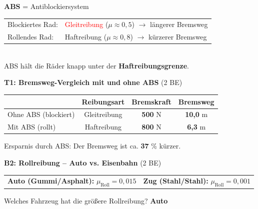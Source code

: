 \documentclass[a4paper,11pt]{article}
\newcommand{\lsg}[1]{\textcolor{loesung}{\textbf{#1}}}
\begin{document}
\begin{tcolorbox}[colback=white, colframe=physik, boxrule=1pt, arc=0pt,
    title={\textbf{K2: So funktioniert ABS}}, fonttitle=\normalsize, coltitle=black, colbacktitle=white]
\textbf{ABS} = Antiblockiersystem\\[1mm]
\begin{tabular}{@{}ll@{}}
Blockiertes Rad: & \textcolor{red}{Gleitreibung} ($\mu \approx 0{,}5$) $\rightarrow$ längerer Bremsweg \\
Rollendes Rad: & \textcolor{success}{Haftreibung} ($\mu \approx 0{,}8$) $\rightarrow$ kürzerer Bremsweg \\
\end{tabular}\\[1mm]
ABS hält die Räder knapp unter der \lsg{Haftreibungsgrenze}.
\end{tcolorbox}

\vspace{2mm}


\textbf{T1: Bremsweg-Vergleich mit und ohne ABS} \hfill (2 BE)

\begin{center}
\begin{tabular}{|l|c|c|c|}
\hline
\rowcolor{white}
 & \textbf{Reibungsart} & \textbf{Bremskraft} & \textbf{Bremsweg} \\
\hline
Ohne ABS (blockiert) & Gleitreibung & \lsg{500} N & \lsg{10,0} m \\
\hline
Mit ABS (rollt) & Haftreibung & \lsg{800} N & \lsg{6,3} m \\
\hline
\end{tabular}
\end{center}

Ersparnis durch ABS: Der Bremsweg ist ca. \lsg{37} \% kürzer.

\vspace{2mm}


\textbf{B2: Rollreibung – Auto vs. Eisenbahn} \hfill (2 BE)

\begin{tabular}{@{}p{7cm}p{7cm}@{}}
\textbf{Auto (Gummi/Asphalt):} $\mu_{\text{Roll}} = 0{,}015$ & \textbf{Zug (Stahl/Stahl):} $\mu_{\text{Roll}} = 0{,}001$ \\
\end{tabular}

Welches Fahrzeug hat die größere Rollreibung? \lsg{Auto}
\end{document}
